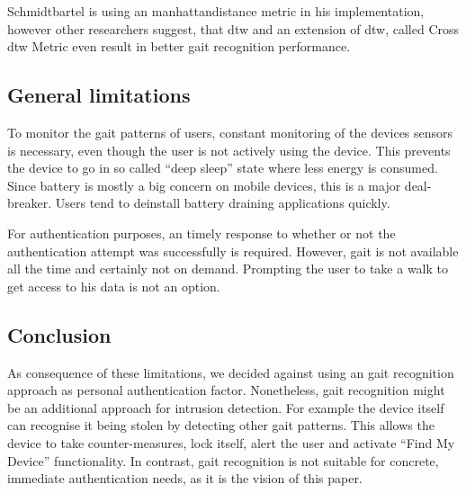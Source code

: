 Schmidtbartel is using an \gls{manhattandistance} metric in his implementation, however other researchers\cite{derawi2013gait} suggest, that \gls{dtw} and an extension of \gls{dtw}, called Cross \gls{dtw} Metric even result in better gait recognition performance.

\subsection{General limitations}
To monitor the gait patterns of users, constant monitoring of the devices sensors is necessary, even though the user is not actively using the device. This prevents the device to go in so called ``deep sleep'' state where less energy is consumed. Since battery is mostly a big concern on mobile devices, this is a major deal-breaker. Users tend to deinstall battery draining applications quickly.

For authentication purposes, an timely response to whether or not the authentication attempt was successfully is required. However, gait is not available all the time and certainly not on demand. Prompting the user to take a walk to get access to his data is not an option.

\subsection{Conclusion}
As consequence of these limitations, we decided against using an gait recognition approach as personal authentication factor. Nonetheless, gait recognition might be an additional approach for intrusion detection. For example the device itself can recognise it being stolen by detecting other gait patterns. This allows the device to take counter-measures, \eg lock itself, alert the user and activate ``Find My Device'' functionality.
In contrast, gait recognition is not suitable for concrete, immediate authentication needs, as it is the vision of this paper.
